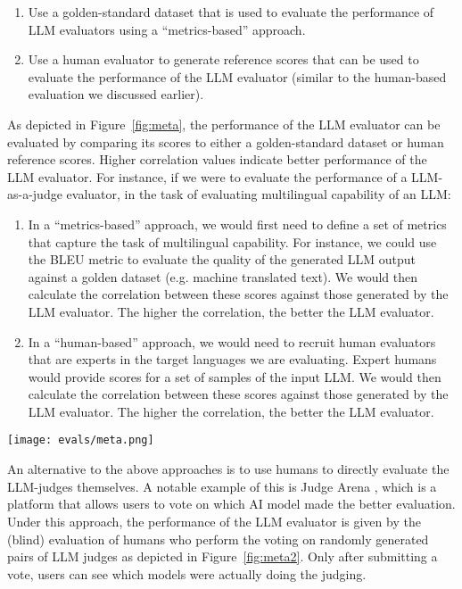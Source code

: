\begin{enumerate}
    \item Use a golden-standard dataset that is used to evaluate the performance of LLM evaluators using a ``metrics-based'' approach.
    \item Use a human evaluator to generate reference scores that can be used to evaluate the performance of the LLM evaluator (similar to the human-based evaluation we discussed earlier).
\end{enumerate}
As depicted in Figure~\ref{fig:meta}, the performance of the LLM evaluator can be evaluated by comparing its scores to either a golden-standard dataset or human reference scores. Higher correlation values indicate better performance of the LLM evaluator. For instance, if we were to evaluate the performance of a LLM-as-a-judge evaluator, in the task of evaluating multilingual capability of an LLM:
\begin{enumerate}
    \item In a ``metrics-based'' approach, we would first need to define a set of metrics that capture the task of multilingual capability. For instance, we could use the BLEU metric to evaluate the quality of the generated LLM output against a golden dataset (e.g. machine translated text). We would then calculate the correlation between these scores against those generated by the LLM evaluator. The higher the correlation, the better the LLM evaluator.
    \item In a ``human-based'' approach, we would need to recruit human evaluators that are experts in the target languages we are evaluating. Expert humans would provide scores for a set of samples of the input LLM. We would then calculate the correlation between these scores against those generated by the LLM evaluator. The higher the correlation, the better the LLM evaluator.
\end{enumerate}

\begin{figure*}[h]
\caption{Conceptual overview of LLMs Meta Evaluation}
\centering
\texttt{[image: evals/meta.png]}
\label{fig:meta}
\end{figure*}
An alternative to the above approaches is to use humans to directly evaluate the LLM-judges themselves. A notable example of this is Judge Arena , which is a platform that allows users to vote on which AI model made the better evaluation. Under this approach, the performance of the LLM evaluator is given by the (blind) evaluation of humans who perform the voting on randomly generated pairs of LLM judges as depicted in Figure~\ref{fig:meta2}. Only after submitting a vote, users can see which models were actually doing the judging.


